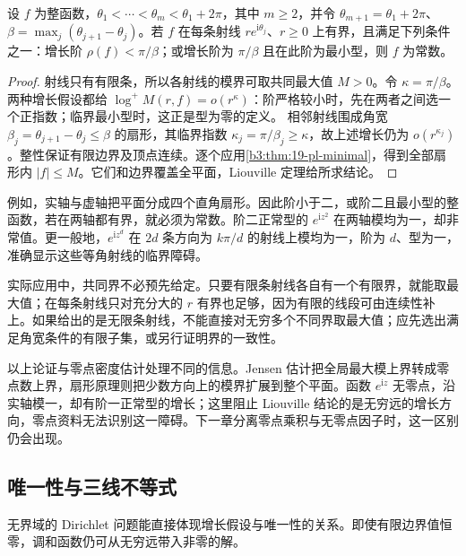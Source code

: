\begin{corollary}[有限射线上的有界性]\label{b3:cor:19-ray-liouville}
设 \(f\) 为整函数，\(\theta_1<\cdots<\theta_m<\theta_1+2\pi\)，其中 \(m\ge2\)，并令 \(\theta_{m+1}=\theta_1+2\pi\)、\(\beta=\max_j(\theta_{j+1}-\theta_j)\)。若 \(f\) 在每条射线 \(re^{\mathrm i\theta_j}\)、\(r\ge0\) 上有界，且满足下列条件之一：增长阶 \(\rho(f)<\pi/\beta\)；或增长阶为 \(\pi/\beta\) 且在此阶为最小型，则 \(f\) 为常数。
\end{corollary}
\begin{proof}
射线只有有限条，所以各射线的模界可取共同最大值 \(M>0\)。令 \(\kappa=\pi/\beta\)。两种增长假设都给
\(\log^+M(r,f)=o(r^\kappa)\)：阶严格较小时，先在两者之间选一个正指数；临界最小型时，这正是型为零的定义。
相邻射线围成角宽 \(\beta_j=\theta_{j+1}-\theta_j\le\beta\) 的扇形，其临界指数 \(\kappa_j=\pi/\beta_j\ge\kappa\)，故上述增长仍为 \(o(r^{\kappa_j})\)。整性保证有限边界及顶点连续。逐个应用\cref{b3:thm:19-pl-minimal}，得到全部扇形内 \(|f|\le M\)。它们和边界覆盖全平面，Liouville 定理给所求结论。
\end{proof}

例如，实轴与虚轴把平面分成四个直角扇形。因此阶小于二，或阶二且最小型的整函数，若在两轴都有界，就必须为常数。阶二正常型的 \(e^{\mathrm iz^2}\) 在两轴模均为一，却非常值。更一般地，\(e^{\mathrm iz^d}\) 在 \(2d\) 条方向为 \(k\pi/d\) 的射线上模均为一，阶为 \(d\)、型为一，准确显示这些等角射线的临界障碍。

\ProseParagraphBreak

实际应用中，共同界不必预先给定。只要有限条射线各自有一个有限界，就能取最大值；在每条射线只对充分大的 \(r\) 有界也足够，因为有限的线段可由连续性补上。如果给出的是无限条射线，不能直接对无穷多个不同界取最大值；应先选出满足角宽条件的有限子集，或另行证明界的一致性。

\ProseParagraphBreak

以上论证与零点密度估计处理不同的信息。Jensen 估计把全局最大模上界转成零点数上界，扇形原理则把少数方向上的模界扩展到整个平面。函数 \(e^{\mathrm iz}\) 无零点，沿实轴模一，却有阶一正常型的增长；这里阻止 Liouville 结论的是无穷远的增长方向，零点资料无法识别这一障碍。下一章分离零点乘积与无零点因子时，这一区别仍会出现。

\subsection{唯一性与三线不等式}
\label{b3:subsec:190404}

无界域的 Dirichlet 问题能直接体现增长假设与唯一性的关系。即使有限边界值恒零，调和函数仍可从无穷远带入非零的解。

